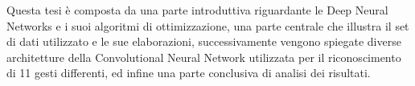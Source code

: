 Questa tesi è composta da una parte introduttiva riguardante le Deep Neural Networks e i suoi algoritmi di ottimizzazione, una parte centrale che illustra il set di dati utilizzato e le sue elaborazioni, successivamente vengono spiegate diverse architetture della Convolutional Neural Network utilizzata per il riconoscimento di 11 gesti differenti, ed infine una parte conclusiva di analisi dei risultati.\\

